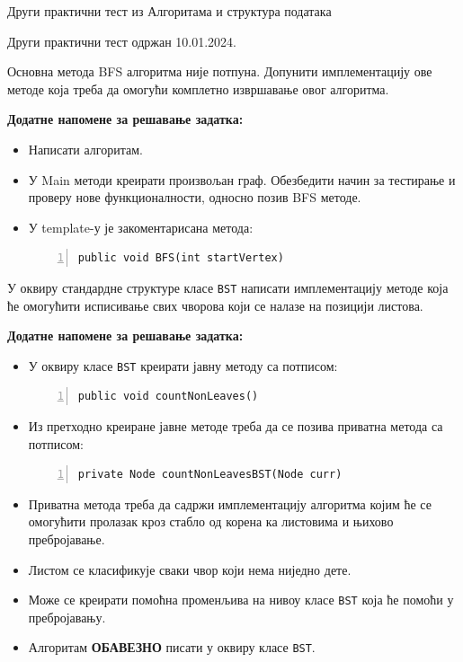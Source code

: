 
Други практични тест из Алгоритама и структура података

Други практични тест одржан 10.01.2024.

Основна метода BFS алгоритма није потпуна. Допунити имплементацију ове методе која треба да омогући комплетно извршавање овог алгоритма.

\textbf{Додатне напомене за решавање задатка:}
\begin{itemize}
	\item Написати алгоритам.
	\item У Main методи креирати произвољан граф. Обезбедити начин за тестирање и проверу нове функционалности, односно позив BFS методе.
	\item У template-у је закоментарисана метода:
	\begin{Verbatim}[fontsize=\footnotesize, numbers=left, xleftmargin=10mm]
public void BFS(int startVertex)
	\end{Verbatim}
\end{itemize}



У оквиру стандардне структуре класе \texttt{BST} написати имплементацију методе која ће омогућити исписивање свих чворова који се налазе на позицији листова.

\textbf{Додатне напомене за решавање задатка:}
\begin{itemize}
	\item У оквиру класе \texttt{BST} креирати јавну методу са потписом:
	\begin{Verbatim}[fontsize=\footnotesize, numbers=left, xleftmargin=10mm]
public void countNonLeaves()
	\end{Verbatim}
	\item Из претходно креиране јавне методе треба да се позива приватна метода са потписом:
	\begin{Verbatim}[fontsize=\footnotesize, numbers=left, xleftmargin=10mm]
private Node countNonLeavesBST(Node curr)
	\end{Verbatim}
	\item Приватна метода треба да садржи имплементацију алгоритма којим ће се омогућити пролазак кроз стабло од корена ка листовима и њихово пребројавање.
	\item Листом се класификује сваки чвор који нема ниједно дете.
	\item Може се креирати помоћна променљива на нивоу класе \texttt{BST} која ће помоћи у пребројавању.
	\item Алгоритам \textbf{ОБАВЕЗНО} писати у оквиру класе \texttt{BST}.
\end{itemize}

